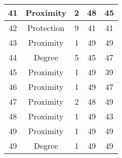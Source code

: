 \documentclass[results.tex]{subfiles}
\begin{document}
\begin{center}
\begin{tabular}{| c || c | c | c | c |}
            \hline
            41                      & Proximity                    & 2                      & 48                      & 45                   \\
            \hline
            42                      & Protection                   & 9                      & 41                      & 41                   \\
            \hline
            43                      & Proximity                    & 1                      & 49                      & 49                   \\
            \hline
            44                      & Degree                       & 5                      & 45                      & 47                   \\
            \hline
            45                      & Proximity                    & 1                      & 49                      & 39                   \\
            \hline
            46                      & Proximity                    & 1                      & 49                      & 47                   \\
            \hline
            47                      & Proximity                    & 2                      & 48                      & 49                   \\
            \hline
            48                      & Proximity                    & 1                      & 49                      & 43                   \\
            \hline
            49                      & Proximity                    & 1                      & 49                      & 49                   \\
            \hline
            49                      & Degree                       & 1                      & 49                      & 49                   \\
            \hline
        \end{tabular}
    \end{center}
\end{document}
